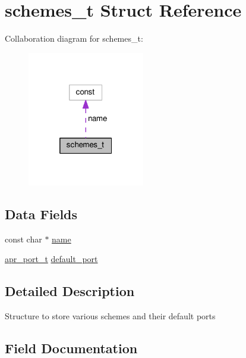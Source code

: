 \hypertarget{structschemes__t}{}\section{schemes\+\_\+t Struct Reference}
\label{structschemes__t}


Collaboration diagram for schemes\+\_\+t\+:
\nopagebreak
\begin{figure}[H]
\begin{center}
\leavevmode
\includegraphics[width=145pt]{structschemes__t__coll__graph}
\end{center}
\end{figure}
\subsection*{Data Fields}
\begin{DoxyCompactItemize}
\item 
const char $\ast$ \hyperlink{structschemes__t_ac8dbfa800d2f925cf1a8641f0a279e31}{name}
\item 
\hyperlink{group__apr__network__io_gaa670a71960f6eb4fe0d0de2a1e7aba03}{apr\+\_\+port\+\_\+t} \hyperlink{structschemes__t_a8a38fa1c9e9571304168a3399870e36e}{default\+\_\+port}
\end{DoxyCompactItemize}


\subsection{Detailed Description}
Structure to store various schemes and their default ports 

\subsection{Field Documentation}
